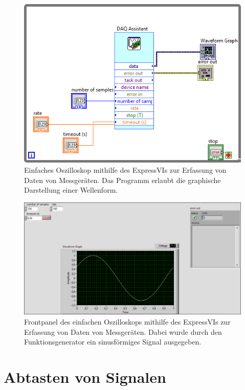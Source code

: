 \documentclass[
a4paper,
12pt,
pagesize,
ngerman
]{scrartcl}
\begin{document}
	\begin{figure}[H]  
		\includegraphics[width=1\textwidth]{EIRE2018Dateien/Tag2/expressVI_1d}
		\centering
		\caption{
			Einfaches Oszilloskop mithilfe des ExpressVIs zur Erfassung von Daten von Messgeräten. Das Programm erlaubt die graphische Darstellung einer Wellenform.
		}
		\label{fig_tag2_oszi_express_block}
		\centering
	\end{figure}
	\begin{figure}[H]  
		\includegraphics[width=1\textwidth]{EIRE2018Dateien/Tag2/expressVI_1p}
		\centering
		\caption{
			Frontpanel des einfachen Oszilloskops mithilfe des ExpressVIs zur Erfassung von Daten von Messgeräten. Dabei wurde durch den Funktionsgenerator ein sinusförmiges Signal ausgegeben.
		}
		\label{fig_tag2_oszi_express_front}
	\centering
	\end{figure}
	
	\newpage
	
	
	\section{Abtasten von Signalen}
	
\end{document}

